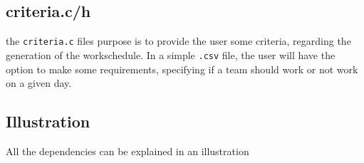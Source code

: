 \subsection{criteria.c/h}
the \verb|criteria.c| files purpose is to provide the user some criteria, regarding the generation of the workschedule. In a simple \verb|.csv| file, the user will have the option to make some requirements, specifying if a team should work or not work on a given day.

\subsection{Illustration}
All the dependencies can be explained in an illustration

